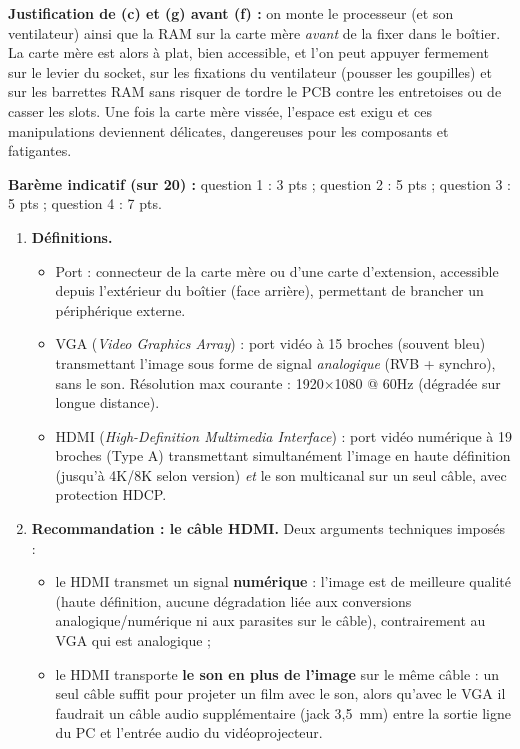 \documentclass[11pt]{article}
\newcommand{\cle}[1]{{\popxbold\color{popdark}#1}}
\begin{document}
\begin{corrige}
\begin{enumerate}
\end{enumerate}
\textbf{Justification de (c) et (g) avant (f) :} on monte le processeur (et son ventilateur) ainsi que la RAM sur la carte mère \emph{avant} de la fixer dans le boîtier. La carte mère est alors à plat, bien accessible, et l'on peut appuyer fermement sur le levier du socket, sur les fixations du ventilateur (pousser les goupilles) et sur les barrettes RAM sans risquer de tordre le PCB contre les entretoises ou de casser les slots. Une fois la carte mère vissée, l'espace est exigu et ces manipulations deviennent délicates, dangereuses pour les composants et fatigantes.
\end{corrige}

\begin{corrige}
\textbf{Barème indicatif (sur 20) :} question 1 : 3 pts ; question 2 : 5 pts ; question 3 : 5 pts ; question 4 : 7 pts.
\begin{enumerate}
  \item \textbf{Définitions.}
  \begin{itemize}
    \item \cle{Port} : connecteur de la carte mère ou d'une carte d'extension, accessible depuis l'extérieur du boîtier (face arrière), permettant de brancher un périphérique externe.
    \item \cle{VGA} (\emph{Video Graphics Array}) : port vidéo à 15 broches (souvent bleu) transmettant l'image sous forme de signal \emph{analogique} (RVB + synchro), sans le son. Résolution max courante : 1920$\times$1080 @ 60Hz (dégradée sur longue distance).
    \item \cle{HDMI} (\emph{High-Definition Multimedia Interface}) : port vidéo numérique à 19 broches (Type A) transmettant simultanément l'image en haute définition (jusqu'à 4K/8K selon version) \emph{et} le son multicanal sur un seul câble, avec protection HDCP.
  \end{itemize}
  \item \textbf{Recommandation : le câble HDMI.} Deux arguments techniques imposés :
  \begin{itemize}
    \item le HDMI transmet un signal \textbf{numérique} : l'image est de meilleure qualité (haute définition, aucune dégradation liée aux conversions analogique/numérique ni aux parasites sur le câble), contrairement au VGA qui est analogique ;
    \item le HDMI transporte \textbf{le son en plus de l'image} sur le même câble : un seul câble suffit pour projeter un film avec le son, alors qu'avec le VGA il faudrait un câble audio supplémentaire (jack 3,5~mm) entre la sortie ligne du PC et l'entrée audio du vidéoprojecteur.

\end{itemize}
\end{enumerate}
\end{corrige}
\end{document}
